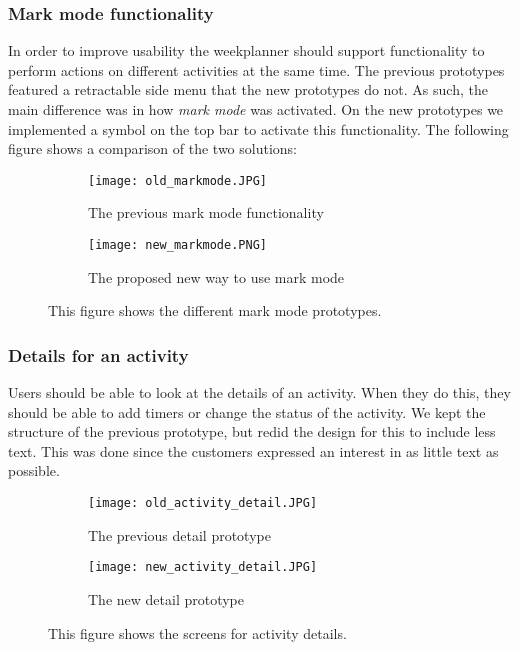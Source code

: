 \subsubsection{Mark mode functionality}
In order to improve usability the weekplanner should support functionality to perform actions on different activities at the same time.
The previous prototypes featured a retractable side menu that the new prototypes do not.
As such, the main difference was in how \textit{mark mode} was activated. 
On the new prototypes we implemented a symbol on the top bar to activate this functionality.
The following figure shows a comparison of the two solutions:

\begin{figure}[H]
    \begin{subfigure}{0.5\textwidth}
    \texttt{[image: old\_markmode.JPG]} 
    \caption{The previous mark mode functionality}
    \label{fig:old_markmode}
    \end{subfigure}
    \begin{subfigure}{0.5\textwidth}
        \texttt{[image: new\_markmode.PNG]}
    \caption{The proposed new way to use mark mode}
    \label{fig:new_markmode}
    \end{subfigure} 
    \caption{This figure shows the different mark mode prototypes.}
    \label{fig:markmode_prototypes}
\end{figure}

\subsubsection{Details for an activity}
Users should be able to look at the details of an activity.
When they do this, they should be able to add timers or change the status of the activity.
We kept the structure of the previous prototype, but redid the design for this to include less text. 
This was done since the customers expressed an interest in as little text as possible.
\begin{figure}[H]
    \begin{subfigure}{0.5\textwidth}
    \texttt{[image: old\_activity\_detail.JPG]} 
    \caption{The previous detail prototype}
    \label{fig:old_activity_detail}
    \end{subfigure}
    \begin{subfigure}{0.5\textwidth}
        \texttt{[image: new\_activity\_detail.JPG]}
    \caption{The new detail prototype}
    \label{fig:new_activity_details}
    \end{subfigure} 
    \caption{This figure shows the screens for activity details.}
    \label{fig:activity_detail_prototypes}
\end{figure}

